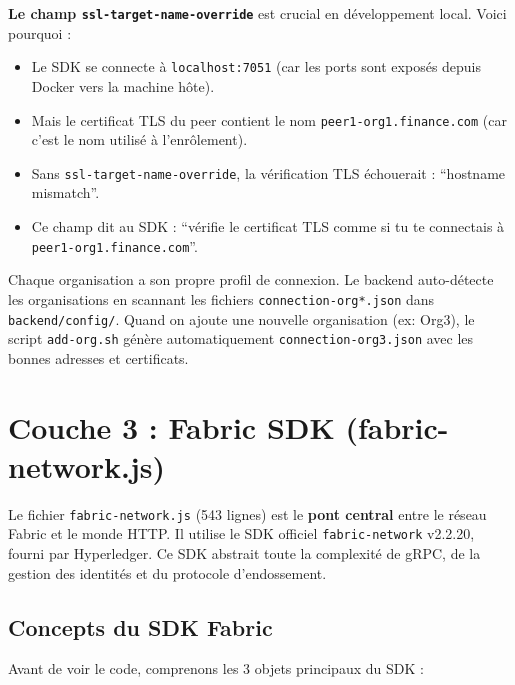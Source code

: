 \documentclass[12pt,a4paper,twoside]{report}
\begin{document}
\begin{warningbox}
\textbf{Le champ \texttt{ssl-target-name-override}} est crucial en développement local. Voici pourquoi :
\begin{itemize}
    \item Le SDK se connecte à \texttt{localhost:7051} (car les ports sont exposés depuis Docker vers la machine hôte).
    \item Mais le certificat TLS du peer contient le nom \texttt{peer1-org1.finance.com} (car c'est le nom utilisé à l'enrôlement).
    \item Sans \texttt{ssl-target-name-override}, la vérification TLS échouerait : ``hostname mismatch''.
    \item Ce champ dit au SDK : ``vérifie le certificat TLS comme si tu te connectais à \texttt{peer1-org1.finance.com}''.
\end{itemize}
\end{warningbox}

\begin{infobox}
Chaque organisation a son propre profil de connexion. Le backend auto-détecte les organisations en scannant les fichiers \texttt{connection-org*.json} dans \texttt{backend/config/}. Quand on ajoute une nouvelle organisation (ex: Org3), le script \texttt{add-org.sh} génère automatiquement \texttt{connection-org3.json} avec les bonnes adresses et certificats.
\end{infobox}

\section{Couche 3 : Fabric SDK (fabric-network.js)}

Le fichier \texttt{fabric-network.js} (543 lignes) est le \textbf{pont central} entre le réseau Fabric et le monde HTTP. Il utilise le SDK officiel \texttt{fabric-network} v2.2.20, fourni par Hyperledger. Ce SDK abstrait toute la complexité de gRPC, de la gestion des identités et du protocole d'endossement.

\subsection{Concepts du SDK Fabric}

Avant de voir le code, comprenons les 3 objets principaux du SDK :
\end{document}
